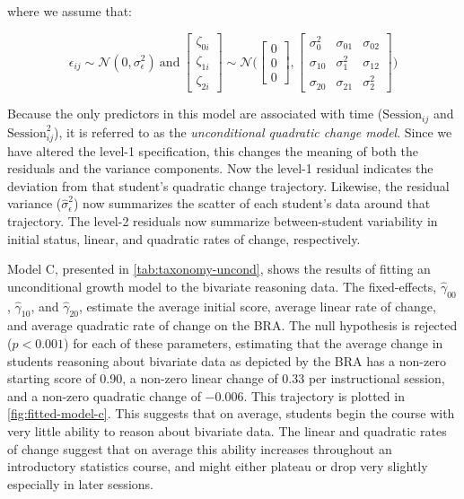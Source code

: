 \documentclass[11pt]{umnthesis}
\begin{document}
where we assume that:

\[
\epsilon_{ij} \sim \mathcal{N}(0,\sigma^2_{\epsilon})~\mathrm{and}~\begin{bmatrix}\zeta_{0i} \\ \zeta_{1i} \\ \zeta_{2i}\end{bmatrix} \sim \mathcal{N}\bigg(\begin{bmatrix}0 \\ 0 \\ 0\end{bmatrix},\begin{bmatrix}\sigma^2_{0} & \sigma_{01} & \sigma_{02} \\ \sigma_{10} & \sigma^2_{1} & \sigma_{12} \\ \sigma_{20} & \sigma_{21} & \sigma^2_{2}\end{bmatrix}\bigg)
\]

Because the only predictors in this model are associated with time (\(\mathrm{Session}_{ij}\) and \(\mathrm{Session}_{ij}^2\)), it is referred to as the \emph{unconditional quadratic change model}. Since we have altered the level-1 specification, this changes the meaning of both the residuals and the variance components. Now the level-1 residual indicates the deviation from that student's quadratic change trajectory. Likewise, the residual variance (\(\hat\sigma^2_{\epsilon}\)) now summarizes the scatter of each student's data around that trajectory. The level-2 residuals now summarize between-student variability in initial status, linear, and quadratic rates of change, respectively.

Model C, presented in \ref{tab:taxonomy-uncond}, shows the results of fitting an unconditional growth model to the bivariate reasoning data. The fixed-effects, \(\hat\gamma_{00}\), \(\hat\gamma_{10}\), and \(\hat\gamma_{20}\), estimate the average initial score, average linear rate of change, and average quadratic rate of change on the BRA. The null hypothesis is rejected (\(p<0.001\)) for each of these parameters, estimating that the average change in students reasoning about bivariate data as depicted by the BRA has a non-zero starting score of 0.90, a non-zero linear change of 0.33 per instructional session, and a non-zero quadratic change of \(-0.006\). This trajectory is plotted in \ref{fig:fitted-model-c}. This suggests that on average, students begin the course with very little ability to reason about bivariate data. The linear and quadratic rates of change suggest that on average this ability increases throughout an introductory statistics course, and might either plateau or drop very slightly especially in later sessions.
\end{document}
